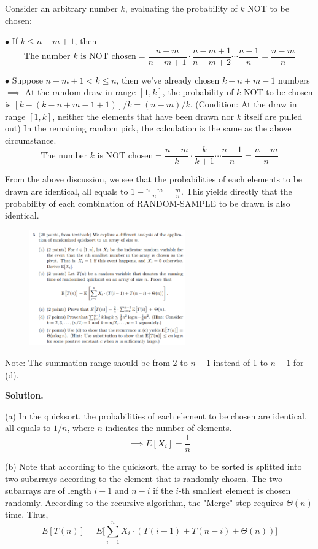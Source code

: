 \documentclass[10pt]{article}
\begin{document}
Consider an arbitrary number $k$, evaluating the probability of $k$ NOT to be chosen:

$\bullet$ If $k \leq n-m+1$, then
$$
\text{The number $k$ is NOT chosen} = \frac{n-m}{n-m+1} \cdot \frac{n-m+1}{n-m+2} \cdots \frac{n-1}{n} = \frac{n-m}{n}
$$

$\bullet$ Suppose $n-m+1 < k \leq n$, then we've already chosen $k-n+m-1$ numbers $\implies$ At the random draw in range $[1, k]$, the probability of $k$ NOT to be chosen is $[k-(k-n+m-1+1)]/k = (n-m)/k$. (Condition: At the draw in range $[1, k]$, neither the elements that have been drawn nor $k$ itself are pulled out) In the remaining random pick, the calculation is the same as the above circumstance.
$$
\text{The number $k$ is NOT chosen} = \frac{n-m}{k} \cdot \frac{k}{k+1} \cdots \frac{n-1}{n} = \frac{n-m}{n}
$$

From the above discussion, we see that the probabilities of each elements to be drawn are identical, all equals to $1-\frac{n-m}{n} = \frac{m}{n}$. This yields directly that the probability of each combination of RANDOM-SAMPLE to be drawn is also identical.

\newpage

\begin{figure}[h]
	\centering
	\includegraphics[width=0.6\textwidth]{hw2-5}
\end{figure}
Note: The summation range should be from 2 to $n-1$ instead of 1 to $n-1$ for (d).

\textbf{Solution.}

(a) In the quicksort, the probabilities of each element to be chosen are identical, all equals to $1/n$, where $n$ indicates the number of elements.
$$
\implies E[X_i] = \frac{1}{n}
$$

(b) Note that according to the quicksort, the array to be sorted is splitted into two subarrays according to the element that is randomly chosen. The two subarrays are of length $i-1$ and $n-i$ if the $i$-th smallest element is chosen randomly. According to the recursive algorithm, the "Merge" step requires $\Theta(n)$ time. Thus,
$$
E[T(n)] = E\bigg[\sum_{i=1}^{n} X_i \cdot (T(i-1) + T(n-i) + \Theta(n))\bigg]
$$
\end{document}
